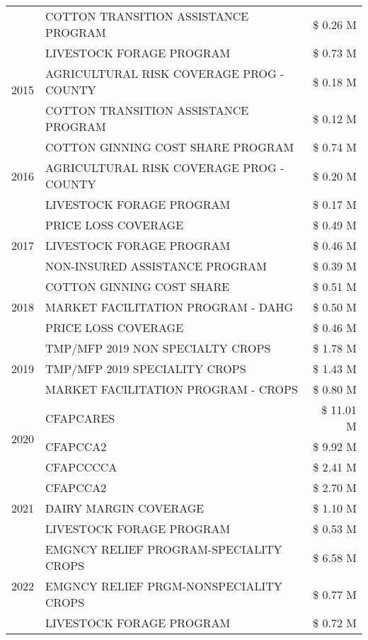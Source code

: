 \begin{tabular}{llr}
 & COTTON TRANSITION ASSISTANCE PROGRAM & \$ 0.26 M \\
\cline{1-3}
\multirow[t]{3}{*}{2015} & LIVESTOCK FORAGE PROGRAM & \$ 0.73 M \\
 & AGRICULTURAL RISK COVERAGE PROG - COUNTY & \$ 0.18 M \\
 & COTTON TRANSITION ASSISTANCE PROGRAM & \$ 0.12 M \\
\cline{1-3}
\multirow[t]{3}{*}{2016} & COTTON GINNING COST SHARE PROGRAM & \$ 0.74 M \\
 & AGRICULTURAL RISK COVERAGE PROG - COUNTY & \$ 0.20 M \\
 & LIVESTOCK FORAGE PROGRAM & \$ 0.17 M \\
\cline{1-3}
\multirow[t]{3}{*}{2017} & PRICE LOSS COVERAGE & \$ 0.49 M \\
 & LIVESTOCK FORAGE PROGRAM & \$ 0.46 M \\
 & NON-INSURED ASSISTANCE PROGRAM & \$ 0.39 M \\
\cline{1-3}
\multirow[t]{3}{*}{2018} & COTTON GINNING COST SHARE & \$ 0.51 M \\
 & MARKET FACILITATION PROGRAM - DAHG & \$ 0.50 M \\
 & PRICE LOSS COVERAGE & \$ 0.46 M \\
\cline{1-3}
\multirow[t]{3}{*}{2019} & TMP/MFP 2019 NON SPECIALTY CROPS & \$ 1.78 M \\
 & TMP/MFP 2019 SPECIALITY CROPS & \$ 1.43 M \\
 & MARKET FACILITATION PROGRAM - CROPS & \$ 0.80 M \\
\cline{1-3}
\multirow[t]{3}{*}{2020} & CFAPCARES & \$ 11.01 M \\
 & CFAPCCA2 & \$ 9.92 M \\
 & CFAPCCCCA & \$ 2.41 M \\
\cline{1-3}
\multirow[t]{3}{*}{2021} & CFAPCCA2 & \$ 2.70 M \\
 & DAIRY MARGIN COVERAGE & \$ 1.10 M \\
 & LIVESTOCK FORAGE PROGRAM & \$ 0.53 M \\
\cline{1-3}
\multirow[t]{3}{*}{2022} & EMGNCY RELIEF PROGRAM-SPECIALITY CROPS & \$ 6.58 M \\
 & EMGNCY RELIEF PRGM-NONSPECIALITY CROPS & \$ 0.77 M \\
 & LIVESTOCK FORAGE PROGRAM & \$ 0.72 M \\
\cline{1-3}
\bottomrule
\end{tabular}
